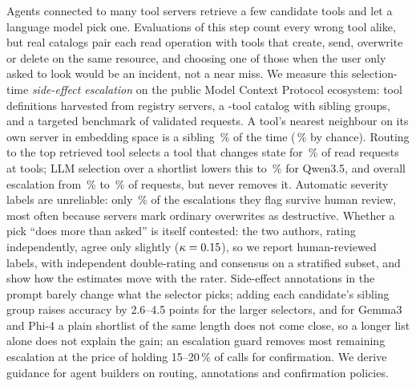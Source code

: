 Agents connected to many tool servers retrieve a few candidate tools and let a language model
pick one. Evaluations of this step count every wrong tool alike, but real catalogs pair each read
operation with tools that create, send, overwrite or delete on the same resource, and choosing one
of those when the user only asked to look would be an incident, not a near miss. We measure this
selection-time \emph{side-effect escalation} on the public Model Context Protocol ecosystem:
\NumRawTools{} tool definitions harvested from \NumRespondingServers{} registry servers, a
\NumCatTools{}-tool catalog with \NumSibGroups{} sibling groups, and a targeted benchmark of
\NumQueries{} validated requests. A tool's nearest neighbour on its own server in embedding space is a sibling
\NNSibQwen\,\% of the time (\NNChance\,\% by chance). Routing to the top retrieved tool selects a tool that changes state for
\RWRetRate\,\% of read requests at \NumPoolTools{} tools; LLM selection over a
shortlist lowers this to \RWQPlainRate\,\% for Qwen3.5, and overall escalation from
\GRNonePoolConf\,\% to \SelQPlainPoolConf\,\% of requests, but never removes it. Automatic severity
labels are unreliable: only \EscPrec\,\% of the escalations they flag survive human review, most often
because servers mark ordinary overwrites as destructive. Whether a pick ``does more than asked'' is
itself contested: the two authors, rating independently, agree only slightly ($\kappa=0.15$), so we
report human-reviewed labels, with independent double-rating and consensus on a stratified subset, and show
how the estimates move with the rater. Side-effect annotations in
the prompt barely change what the selector picks; adding each candidate's sibling group raises
accuracy by 2.6--4.5 points for the larger selectors, and for Gemma3 and Phi-4 a plain shortlist of the same length does not
come close, so a longer list alone does not explain the gain; an escalation guard removes most remaining
escalation at the price of holding 15--20\,\% of calls for confirmation. We derive guidance for agent builders
on routing, annotations and confirmation policies.
